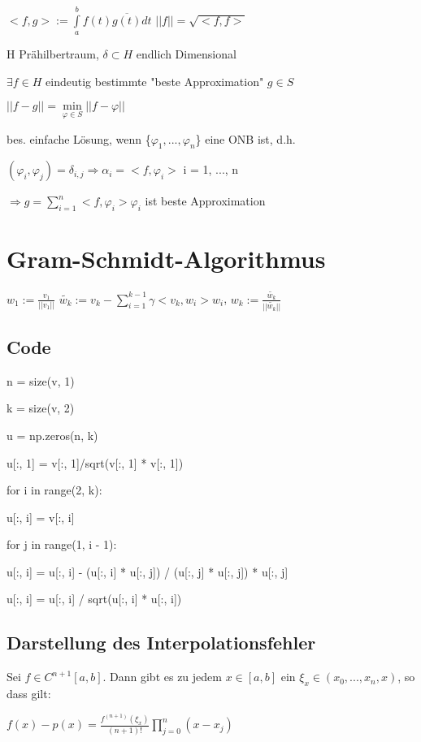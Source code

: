 \documentclass[12pt,a4paper]{article} %
\newcommand*\conj[1]{\overline{#1}}
\newcommand*\tab[1][1cm]{\hspace*{#1}}
\begin{document}
	$<f, g>:= \int\limits_{a}^{b}f(t)\conj{g(t)}dt$ \tab $||f|| = \sqrt{<f, f>}$
	
	H Prähilbertraum, $\delta \subset H$ endlich Dimensional
	
	$\exists f \in H$ eindeutig bestimmte "beste Approximation" $g \in S$
	
	\tab $||f - g|| = \min\limits_{\varphi \in S}||f - \varphi||$
	
	bes. einfache Lösung, wenn \{$\varphi_1, ..., \varphi_n$\} eine ONB ist, d.h.
	
	$(\varphi_i, \varphi_j) = \delta_{i, j} \Rightarrow \alpha_i = <f, \varphi_i>$ \tab i = 1, ..., n
	
	\tab $\Rightarrow g = \sum\limits_{i = 1}^{n}<f, \varphi_i>\varphi_i$ ist beste Approximation
	
	\section{Gram-Schmidt-Algorithmus}
	
	$w_1 := \frac{v_1}{||v_1||}$ \space $\tilde{w_k}:=v_k - \sum\limits_{i = 1}^{k - 1}\gamma<v_k, w_i>w_i$, \space $w_k := \frac{\tilde{w_k}}{||\tilde{w_k}||}$
	
	\subsection{Code}
	
	n = size(v, 1)
	
	k = size(v, 2)
	
	u = np.zeros(n, k)
	
	u[:, 1] = v[:, 1]/sqrt(v[:, 1] * v[:, 1])
	
	for i in range(2, k):
	
	\tab u[:, i] = v[:, i]
	
	\tab for j in range(1, i - 1):
	
	\tab \tab u[:, i] = u[:, i] - (u[:, i] * u[:, j]) / (u[:, j] * u[:, j]) * u[:, j]
	
	\tab u[:, i] = u[:, i] / sqrt(u[:, i] * u[:, i])
	
	\subsection{Darstellung des Interpolationsfehler}
	
	Sei $f \in C^{n + 1}[a, b]$. Dann gibt es zu jedem $x \in [a, b]$ ein $\xi_x \in(x_0, ..., x_n, x)$, so dass gilt:
	
	$f(x) - p(x) = \frac{f^{(n + 1)}(\xi_x)}{(n + 1)!}\prod\limits_{j = 0}^n(x - x_j)$ 
	
\end{document}
